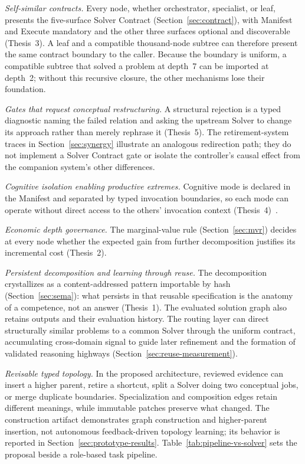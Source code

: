 \documentclass[11pt]{article}
\begin{document}
\emph{Self-similar contracts.} Every node, whether orchestrator, specialist, or leaf, presents the five-surface Solver Contract (Section~\ref{sec:contract}), with Manifest and Execute mandatory and the other three surfaces optional and discoverable (Thesis~3). A leaf and a compatible thousand-node subtree can therefore present the same contract boundary to the caller. Because the boundary is uniform, a compatible subtree that solved a problem at depth~7 can be imported at depth~2; without this recursive closure, the other mechanisms lose their foundation.

\emph{Gates that request conceptual restructuring.} A structural rejection is a typed diagnostic naming the failed relation and asking the upstream Solver to change its approach rather than merely rephrase it (Thesis~5). The retirement-system traces in Section~\ref{sec:synergy} illustrate an analogous redirection path; they do not implement a Solver Contract gate or isolate the controller's causal effect from the companion system's other differences.

\emph{Cognitive isolation enabling productive extremes.} Cognitive mode is declared in the Manifest and separated by typed invocation boundaries, so each mode can operate without direct access to the others' invocation context (Thesis~4)~\cite{Huang2025}.

\emph{Economic depth governance.} The marginal-value rule (Section~\ref{sec:mvr}) decides at every node whether the expected gain from further decomposition justifies its incremental cost (Thesis~2).

\emph{Persistent decomposition and learning through reuse.} The decomposition crystallizes as a content-addressed pattern importable by hash (Section~\ref{sec:sema}): what persists in that reusable specification is the anatomy of a competence, not an answer (Thesis~1). The evaluated solution graph also retains outputs and their evaluation history. The routing layer can direct structurally similar problems to a common Solver through the uniform contract, accumulating cross-domain signal to guide later refinement and the formation of validated reasoning highways (Section~\ref{sec:reuse-measurement}).

\emph{Revisable typed topology.} In the proposed architecture, reviewed evidence can insert a higher parent, retire a shortcut, split a Solver doing two conceptual jobs, or merge duplicate boundaries. Specialization and composition edges retain different meanings, while immutable patches preserve what changed. The construction artifact demonstrates graph construction and higher-parent insertion, not autonomous feedback-driven topology learning; its behavior is reported in Section~\ref{sec:prototype-results}. Table~\ref{tab:pipeline-vs-solver} sets the proposal beside a role-based task pipeline.
\end{document}
